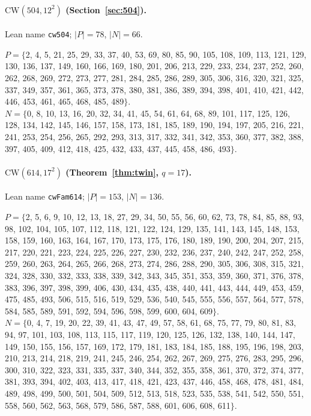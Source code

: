 \paragraph{$\mathrm{CW}(504,12^2)$ (Section~\ref{sec:504}).} Lean name \texttt{cw504}; $|P|=78$, $|N|=66$.\\
{\footnotesize\raggedright $P=\{$2, 4, 5, 21, 25, 29, 33, 37, 40, 53, 69, 80, 85, 90, 105, 108, 109, 113, 121, 129, 130, 136, 137, 149, 160, 166, 169, 180, 201, 206, 213, 229, 233, 234, 237, 252, 260, 262, 268, 269, 272, 273, 277, 281, 284, 285, 286, 289, 305, 306, 316, 320, 321, 325, 337, 349, 357, 361, 365, 373, 378, 380, 381, 386, 389, 394, 398, 401, 410, 421, 442, 446, 453, 461, 465, 468, 485, 489$\}$.\\
$N=\{$0, 8, 10, 13, 16, 20, 32, 34, 41, 45, 54, 61, 64, 68, 89, 101, 117, 125, 126, 128, 134, 142, 145, 146, 157, 158, 173, 181, 185, 189, 190, 194, 197, 205, 216, 221, 241, 253, 254, 256, 265, 292, 293, 313, 317, 332, 341, 342, 353, 360, 377, 382, 388, 397, 405, 409, 412, 418, 425, 432, 433, 437, 445, 458, 486, 493$\}$.\par}

\paragraph{$\mathrm{CW}(614,17^2)$ (Theorem~\ref{thm:twin}, $q=17$).} Lean name \texttt{cwFam614}; $|P|=153$, $|N|=136$.\\
{\footnotesize\raggedright $P=\{$2, 5, 6, 9, 10, 12, 13, 18, 27, 29, 34, 50, 55, 56, 60, 62, 73, 78, 84, 85, 88, 93, 98, 102, 104, 105, 107, 112, 118, 121, 122, 124, 129, 135, 141, 143, 145, 148, 153, 158, 159, 160, 163, 164, 167, 170, 173, 175, 176, 180, 189, 190, 200, 204, 207, 215, 217, 220, 221, 223, 224, 225, 226, 227, 230, 232, 236, 237, 240, 242, 247, 252, 258, 259, 260, 263, 264, 265, 266, 268, 273, 274, 286, 288, 290, 305, 306, 308, 315, 321, 324, 328, 330, 332, 333, 338, 339, 342, 343, 345, 351, 353, 359, 360, 371, 376, 378, 383, 396, 397, 398, 399, 406, 430, 434, 435, 438, 440, 441, 443, 444, 449, 453, 459, 475, 485, 493, 506, 515, 516, 519, 529, 536, 540, 545, 555, 556, 557, 564, 577, 578, 584, 585, 589, 591, 592, 594, 596, 598, 599, 600, 604, 609$\}$.\\
$N=\{$0, 4, 7, 19, 20, 22, 39, 41, 43, 47, 49, 57, 58, 61, 68, 75, 77, 79, 80, 81, 83, 94, 97, 101, 103, 108, 113, 115, 117, 119, 120, 125, 126, 132, 138, 140, 144, 147, 149, 150, 155, 156, 157, 169, 172, 179, 181, 183, 184, 185, 188, 195, 196, 198, 203, 210, 213, 214, 218, 219, 241, 245, 246, 254, 262, 267, 269, 275, 276, 283, 295, 296, 300, 310, 322, 323, 331, 335, 337, 340, 344, 352, 355, 358, 361, 370, 372, 374, 377, 381, 393, 394, 402, 403, 413, 417, 418, 421, 423, 437, 446, 458, 468, 478, 481, 484, 489, 498, 499, 500, 501, 504, 509, 512, 513, 518, 523, 535, 538, 541, 542, 550, 551, 558, 560, 562, 563, 568, 579, 586, 587, 588, 601, 606, 608, 611$\}$.\par}

